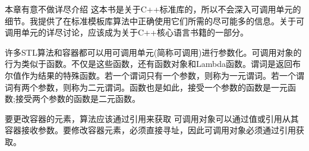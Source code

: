 

\begin{myNotic}{本章有意不做详尽介绍}
这本书是关于C++标准库的，所以不会深入可调用单元的细节。我提供了在标准模板库算法中正确使用它们所需的尽可能多的信息。关于可调用单元的详尽讨论，应该成为关于C++核心语言书籍的一部分。
\end{myNotic}

许多STL算法和容器都可以用可调用单元(简称可调用)进行参数化。可调用对象的行为类似于函数。不仅是这些函数，还有函数对象和Lambda函数。谓词是返回布尔值作为结果的特殊函数。若一个谓词只有一个参数，则称为一元谓词。若一个谓词有两个参数，则称为二元谓词。函数也是如此，接受一个参数的函数是一元函数;接受两个参数的函数是二元函数。

\begin{myTip}{要更改容器的元素，算法应该通过引用来获取}
可调用对象可以通过值或引用从其容器接收参数。要修改容器元素，必须直接寻址，因此可调用对象必须通过引用获取。
\end{myTip}